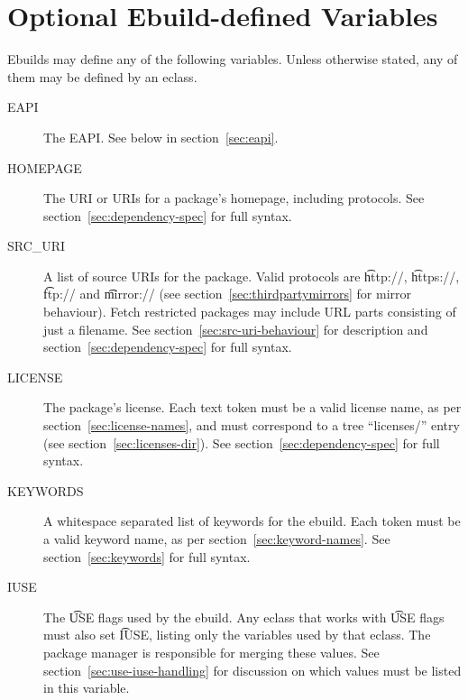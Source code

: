 \section{Optional Ebuild-defined Variables}
\label{sec:optional-vars}

Ebuilds may define any of the following variables. Unless otherwise stated, any of them may be
defined by an eclass.

\begin{description}
\item[EAPI] The EAPI\@. See below in section~\ref{sec:eapi}.
\item[HOMEPAGE] The URI or URIs for a package's homepage, including protocols.
    See section~\ref{sec:dependency-spec} for full syntax.
\item[SRC_URI] A list of source URIs for the package. Valid protocols are \t{http://},
    \t{https://}, \t{ftp://} and \t{mirror://} (see section~\ref{sec:thirdpartymirrors} for mirror
    behaviour). Fetch restricted packages may include URL parts consisting of just a filename.
    See section~\ref{sec:src-uri-behaviour} for description and section~\ref{sec:dependency-spec}
    for full syntax.
\item[LICENSE] The package's license. Each text token must be a valid license name, as per
    section~\ref{sec:license-names}, and must correspond to a tree ``licenses/'' entry
    (see section~\ref{sec:licenses-dir}). See section~\ref{sec:dependency-spec} for full syntax.
\item[KEYWORDS] A whitespace separated list of keywords for the ebuild. Each token must be a valid
    keyword name, as per section~\ref{sec:keyword-names}. See section~\ref{sec:keywords} for full
    syntax.
\item[IUSE] The \t{USE} flags used by the ebuild. Any eclass that works with \t{USE} flags must
    also set \t{IUSE}, listing only the variables used by that eclass. The package manager is
    responsible for merging these values. See section~\ref{sec:use-iuse-handling} for discussion on
    which values must be listed in this variable.


\end{description}
